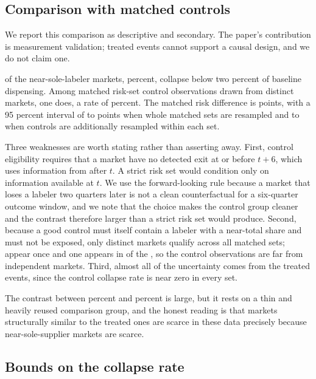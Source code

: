 \documentclass[pdflatex,sn-vancouver-num,Numbered]{sn-jnl}
\begin{document}
\subsection{Comparison with matched controls}\label{subsec:matched}

We report this comparison as descriptive and secondary. The paper's contribution is measurement
validation; \nTreatedW treated events cannot support a causal design, and we do not claim one.

\nTreatedCollUC of the \nTreated near-sole-labeler markets, \nTreatedRate percent, collapse below two percent of baseline
dispensing. Among \nControlObs matched risk-set control observations drawn from \nUniqueControls distinct markets, one
does, a rate of \nControlRate percent. The matched risk difference is \nRiskDiff points, with a 95 percent
interval of \nCILo to \nCIHi points when whole matched sets are resampled and \nCILo to \nCIHiB when
controls are additionally resampled within each set.

Three weaknesses are worth stating rather than asserting away. First, control eligibility
requires that a market have no detected exit at or before $t+6$, which uses information from
after $t$. A strict risk set would condition only on information available at $t$. We use the
forward-looking rule because a market that loses a labeler two quarters later is not a clean
counterfactual for a six-quarter outcome window, and we note that the choice makes the control
group cleaner and the contrast therefore larger than a strict risk set would produce. Second,
because a good control must itself contain a labeler with a near-total share and must not be
exposed, only \nUniqueControls distinct markets qualify across all \nTreated matched sets;
\nControlsOnce appear once and one appears in \nMaxReuse of the \nTreated, so the \nControlObs
control observations are far from \nControlObs independent markets. Third, almost all of the
uncertainty comes from the \nTreatedW treated events, since the
control collapse rate is near zero in every set.

The contrast between \nTreatedRate percent and \nControlRate percent is large, but it rests on a thin and heavily
reused comparison group, and the honest reading is that markets structurally similar to the
treated ones are scarce in these data precisely because near-sole-supplier markets are scarce.

\subsection{Bounds on the collapse rate}\label{subsec:bounds}
\end{document}

